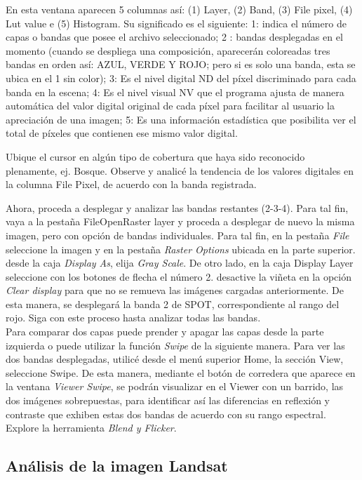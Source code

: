 \documentclass[a4paper,oneside,11pt,]{article}
\begin{document}
En esta ventana aparecen 5 columnas así: (1) Layer, (2) Band, (3) File pixel, (4) Lut value e (5) Histogram. Su significado es el siguiente: 1: indica el número de capas o bandas que posee el archivo seleccionado;  2 : bandas desplegadas en el momento (cuando se despliega una composición, aparecerán coloreadas tres bandas en orden así: AZUL, VERDE Y ROJO; pero si es solo una banda, esta se ubica en el 1 sin color); 3: Es el nivel digital ND del píxel discriminado para cada banda en la escena; 4: Es el nivel visual NV que el programa ajusta de manera automática del valor digital original de cada píxel para facilitar al usuario la apreciación de una imagen; 5: Es una información estadística que posibilita ver el total de píxeles que contienen ese mismo valor digital.
\par Ubique el cursor en algún tipo de cobertura que haya sido reconocido plenamente, ej. Bosque. Observe y analicé la tendencia de los valores digitales en la columna File Pixel, de acuerdo con la banda registrada.
\par Ahora, proceda a desplegar y analizar las bandas restantes (2-3-4). Para tal fin, vaya a la pestaña File\textrightarrow Open\textrightarrow Raster layer y proceda a desplegar de nuevo la misma imagen, pero con opción de bandas individuales. Para tal fin, en la pestaña \emph{File} seleccione la imagen y en la pestaña \emph{Raster Options} ubicada en la parte superior. desde la caja \emph{Display As}, elija \emph{Gray Scale}. De otro lado, en la caja Display Layer seleccione con los botones de flecha el número 2. desactive la viñeta en la opción \emph{Clear display}  para que no se remueva las imágenes cargadas anteriormente. De esta manera, se desplegará la banda 2 de SPOT, correspondiente al rango del rojo. Siga con este proceso hasta analizar todas las bandas.\\
Para comparar dos capas puede prender y apagar las capas desde la parte izquierda o puede utilizar la función \emph{Swipe} de la siguiente manera. Para ver las dos bandas desplegadas, utilicé desde el menú superior Home, la sección View, seleccione Swipe. De esta manera, mediante el botón de corredera que aparece en la ventana \emph{Viewer Swipe}, se podrán visualizar en el Viewer con un barrido, las dos imágenes sobrepuestas, para identificar así las diferencias en reflexión y contraste que exhiben estas dos bandas de acuerdo con su rango espectral. Explore la herramienta \emph{Blend y Flicker}.

\subsection{Análisis de la imagen Landsat}
\end{document}

